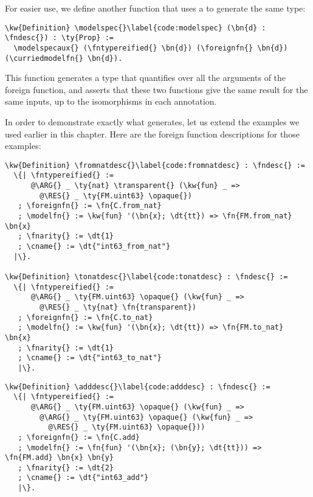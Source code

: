\newpage
For easier use, we define another function \modelspec{} that uses a \fndesc{} to generate the same type:

\begin{Verbatim}
\kw{Definition} \modelspec{}\label{code:modelspec} (\bn{d} : \fndesc{}) : \ty{Prop} :=
  \modelspecaux{} (\fntypereified{} \bn{d}) (\foreignfn{} \bn{d}) (\curriedmodelfn{} \bn{d}).
\end{Verbatim}

This function generates a type that quantifies over all the arguments of the \gls{foreign function}, and asserts that these two functions give the same result for the same inputs, up to the isomorphisms in each annotation.

In order to demonstrate exactly what \modelspec{} generates, let us extend the examples we used earlier in this chapter.  Here are the \gls{foreign function} descriptions for those examples:

\newcommand{\fromnatdesc}{\hyperref[code:fromnatdesc]{\fn{from\_\linebreak[0]nat\_\linebreak[0]desc}}}
\newcommand{\tonatdesc}{\hyperref[code:tonatdesc]{\fn{to\_\linebreak[0]nat\_\linebreak[0]desc}}}
\newcommand{\adddesc}{\hyperref[code:adddesc]{\fn{add\_\linebreak[0]desc}}}
\begin{Verbatim}
\kw{Definition} \fromnatdesc{}\label{code:fromnatdesc} : \fndesc{} :=
  \{| \fntypereified{} :=
      @\ARG{} _ \ty{nat} \transparent{} (\kw{fun} _ =>
        @\RES{} _ \ty{FM.uint63} \opaque{})
   ; \foreignfn{} := \fn{C.from_nat}
   ; \modelfn{} := \kw{fun} '(\bn{x}; \dt{tt}) => \fn{FM.from_nat} \bn{x}
   ; \fnarity{} := \dt{1}
   ; \cname{} := \dt{"int63_from_nat"}
  |\}.

\kw{Definition} \tonatdesc{}\label{code:tonatdesc} : \fndesc{} :=
  \{| \fntypereified{} :=
      @\ARG{} _ \ty{FM.uint63} \opaque{} (\kw{fun} _ =>
        @\RES{} _ \ty{nat} \fn{transparent})
   ; \foreignfn{} := \fn{C.to_nat}
   ; \modelfn{} := \kw{fun} '(\bn{x}; \dt{tt}) => \fn{FM.to_nat} \bn{x}
   ; \fnarity{} := \dt{1}
   ; \cname{} := \dt{"int63_to_nat"}
   |\}.
\end{Verbatim}
\newpage
\begin{Verbatim}
\kw{Definition} \adddesc{}\label{code:adddesc} : \fndesc{} :=
  \{| \fntypereified{} :=
      @\ARG{} _ \ty{FM.uint63} \opaque{} (\kw{fun} _ =>
        @\ARG{} _ \ty{FM.uint63} \opaque{} (\kw{fun} _ =>
          @\RES{} _ \ty{FM.uint63} \opaque{}))
   ; \foreignfn{} := \fn{C.add}
   ; \modelfn{} := \fn{fun} '(\bn{x}; (\bn{y}; \dt{tt})) => \fn{FM.add} \bn{x} \bn{y}
   ; \fnarity{} := \dt{2}
   ; \cname{} := \dt{"int63_add"}
   |\}.
\end{Verbatim}


